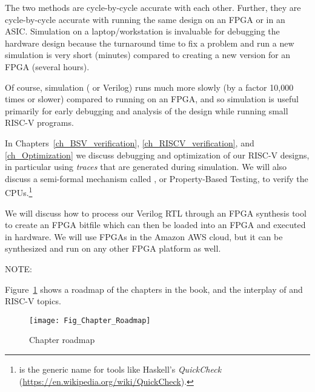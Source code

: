 The two methods are cycle-by-cycle accurate with each other.  Further,
they are cycle-by-cycle accurate with running the same design on an
FPGA or in an ASIC.  Simulation on a laptop/workstation is invaluable
for debugging the hardware design because the turnaround time to fix a
problem and run a new simulation is very short (minutes) compared to
creating a new version for an FPGA (several hours).

Of course, simulation ({\BLUESIM} or Verilog) runs much more slowly
(by a factor 10,000 times or slower) compared to running on an FPGA,
and so simulation is useful primarily for early debugging and analysis
of the design while running small RISC-V programs.

In Chapters~\ref{ch_BSV_verification}, \ref{ch_RISCV_verification},
and \ref{ch_Optimization} we discuss debugging and optimization of our
RISC-V designs, in particular using \emph{traces} that are generated
during simulation.  We will also discuss a semi-formal mechanism
called {\PBT}, or Property-Based Testing, to verify the
CPUs.\footnote{{\PBT} is the generic name for tools like Haskell's
\emph{QuickCheck} (\url{https://en.wikipedia.org/wiki/QuickCheck}).}

We will discuss how to process our Verilog RTL through an FPGA
synthesis tool to create an FPGA bitfile which can then be loaded into
an FPGA and executed in hardware.  We will use FPGAs in the Amazon AWS
cloud, but it can be synthesized and run on any other FPGA platform as
well.

\vspace{1ex}

NOTE: 

\vspace{1ex}

Figure~\ref{Fig_Chapter_Roadmap} shows a roadmap of the chapters in
the book, and the interplay of {\BSV} and RISC-V topics.
\begin{figure}[htbp]
  \centerline{\texttt{[image: Fig\_Chapter\_Roadmap]}}
  \caption{\label{Fig_Chapter_Roadmap}Chapter roadmap}
\end{figure}

